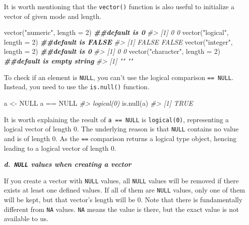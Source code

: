 \documentclass[
]{book}
\newenvironment{Shaded}{\begin{snugshade}}{\end{snugshade}}
\newcommand{\AttributeTok}[1]{\textcolor[rgb]{0.77,0.63,0.00}{#1}}
\newcommand{\CommentTok}[1]{\textcolor[rgb]{0.56,0.35,0.01}{\textit{#1}}}
\newcommand{\ConstantTok}[1]{\textcolor[rgb]{0.00,0.00,0.00}{#1}}
\newcommand{\DecValTok}[1]{\textcolor[rgb]{0.00,0.00,0.81}{#1}}
\newcommand{\DocumentationTok}[1]{\textcolor[rgb]{0.56,0.35,0.01}{\textbf{\textit{#1}}}}
\newcommand{\FunctionTok}[1]{\textcolor[rgb]{0.00,0.00,0.00}{#1}}
\newcommand{\NormalTok}[1]{#1}
\newcommand{\OtherTok}[1]{\textcolor[rgb]{0.56,0.35,0.01}{#1}}
\newcommand{\SpecialCharTok}[1]{\textcolor[rgb]{0.00,0.00,0.00}{#1}}
\newcommand{\StringTok}[1]{\textcolor[rgb]{0.31,0.60,0.02}{#1}}
\begin{document}
It is worth mentioning that the \texttt{vector()} function is also useful to initialize a vector of given mode and length.

\begin{Shaded}
\begin{Highlighting}[]
\FunctionTok{vector}\NormalTok{(}\StringTok{"numeric"}\NormalTok{, }\AttributeTok{length =} \DecValTok{2}\NormalTok{)      }\DocumentationTok{\#\#default is 0}
\CommentTok{\#\textgreater{} [1] 0 0}
\FunctionTok{vector}\NormalTok{(}\StringTok{"logical"}\NormalTok{, }\AttributeTok{length =} \DecValTok{2}\NormalTok{)      }\DocumentationTok{\#\#default is FALSE}
\CommentTok{\#\textgreater{} [1] FALSE FALSE}
\FunctionTok{vector}\NormalTok{(}\StringTok{"integer"}\NormalTok{, }\AttributeTok{length =} \DecValTok{2}\NormalTok{)      }\DocumentationTok{\#\#default is 0}
\CommentTok{\#\textgreater{} [1] 0 0}
\FunctionTok{vector}\NormalTok{(}\StringTok{"character"}\NormalTok{, }\AttributeTok{length =} \DecValTok{2}\NormalTok{)    }\DocumentationTok{\#\#default is empty string}
\CommentTok{\#\textgreater{} [1] "" ""}
\end{Highlighting}
\end{Shaded}

To check if an element is \texttt{NULL}, you can't use the logical comparison \texttt{==\ NULL}. Instead, you need to use the \texttt{is.null()} function.

\begin{Shaded}
\begin{Highlighting}[]
\NormalTok{a }\OtherTok{\textless{}{-}} \ConstantTok{NULL}
\NormalTok{a }\SpecialCharTok{==} \ConstantTok{NULL}
\CommentTok{\#\textgreater{} logical(0)}
\FunctionTok{is.null}\NormalTok{(a)}
\CommentTok{\#\textgreater{} [1] TRUE}
\end{Highlighting}
\end{Shaded}

It is worth explaining the result of \texttt{a\ ==\ NULL} is \texttt{logical(0)}, representing a logical vector of length 0. The underlying reason is that \texttt{NULL} contains no value and is of length 0. As the \texttt{==} comparison returns a logical type object, hencing leading to a logical vector of length 0.

\textbf{\emph{d.~\texttt{NULL} values when creating a vector}}

If you create a vector with \texttt{NULL} values, all \texttt{NULL} values will be removed if there exists at least one defined values. If all of them are \texttt{NULL} values, only one of them will be kept, but that vector's length will be 0. Note that there is fundamentally different from \texttt{NA} values. \texttt{NA} means the value is there, but the exact value is not available to us.
\end{document}
